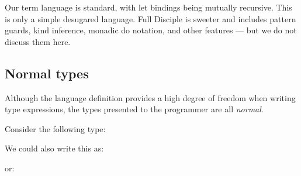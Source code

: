 Our term language is standard, with let bindings being mutually recursive. This is only a simple desugared language. Full Disciple is sweeter and includes pattern guards, kind inference, monadic do notation, and other features --- but we do not discuss them here.


\clearpage{}
\subsection{Normal types}
\label{inference:language:normal-types}

Although the language definition provides a high degree of freedom when writing type expressions, the types presented to the programmer are all \emph{normal}.


Consider the following type:


We could also write this as:


\quad or:


